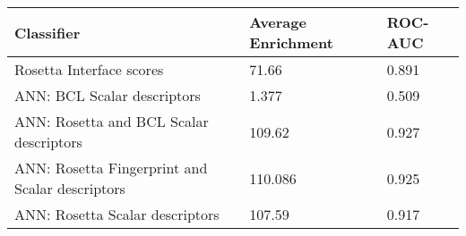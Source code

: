 \begin{tabular}{|l|l|l|}
\hline
\textbf{Classifier} &  \textbf{Average Enrichment} & \textbf{ROC-AUC} \\
\hline
\hline
Rosetta Interface scores & 71.66 & 0.891 \\
\hline
ANN: BCL Scalar descriptors & 1.377 & 0.509 \\
\hline
ANN: Rosetta and BCL Scalar descriptors & 109.62  & 0.927 \\
\hline
ANN: Rosetta Fingerprint and Scalar descriptors & 110.086 & 0.925 \\
\hline
ANN: Rosetta Scalar descriptors & 107.59 & 0.917 \\
\hline
\end{tabular}